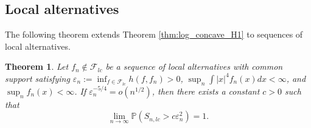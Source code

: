 \documentclass[12pt,letterpaper, twoside, openany]{article}
\theoremstyle{plain}
\newtheorem{theorem}{Theorem}[section]
\begin{document}
        \subsection{Local alternatives}
  The following theorem extends Theorem \ref{thm:log_concave_H1} to sequences of local alternatives.
        \begin{theorem}\label{thm:local_alt_lc_SN}
            Let $f_{n} \notin \mathcal{F}_{lc}$ be a sequence of local alternatives with common support satisfying $\varepsilon_n := \inf_{f \in \mathcal{F}_{lc}} h(f, f_n) > 0$,   $\sup_n \int |x|^4 f_n(x) dx < \infty$, and $\sup_n f_n(x) < \infty$.  If $\varepsilon_n^{-5/4} = o(n^{1/2})$, then there exists a constant $c > 0$ such that
\begin{equation*}
    \lim_{n \rightarrow \infty} \mathbb{P}(S_{n,lc} > c \varepsilon_n^2) = 1.
\end{equation*}
            
        \end{theorem}
\end{document}
